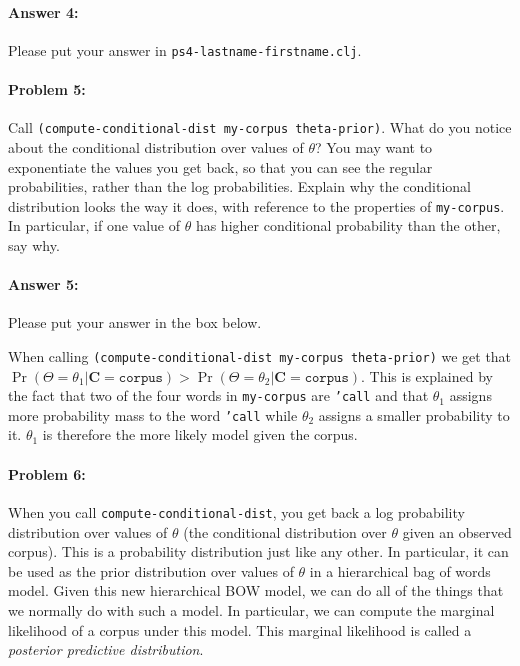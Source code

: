 \documentclass[10pt]{article}
\newcommand{\PSnum}{4}
\begin{document}
\paragraph{Answer 4:} Please put your answer in
\texttt{ps\PSnum-lastname-firstname.clj}.

\noindent\hrulefill %

\paragraph{Problem 5:}
Call \texttt{(compute-conditional-dist my-corpus theta-prior)}. What
do you notice about the conditional distribution over values of
$\theta$?  You may want to exponentiate the values you get back, so
that you can see the regular probabilities, rather than the log
probabilities. Explain why the conditional distribution looks the way
it does, with reference to the properties of \texttt{my-corpus}.  In
particular, if one value of $\theta$ has higher conditional probability
than the other, say why.

\paragraph{Answer 5:} Please put your answer in the box below.

\begin{mdframed}
When calling  \texttt{(compute-conditional-dist my-corpus theta-prior)} we get that $\Pr(\Theta=\theta_1|\mathbf{C}=\texttt{corpus}) >  \Pr(\Theta=\theta_2|\mathbf{C}=\texttt{corpus})$. This is explained by the fact that two of the four words in \texttt{my-corpus} are \texttt{'call} and that  $\theta_1$ assigns more probability mass to the word  \texttt{'call} while $\theta_2$ assigns a smaller probability to it. $\theta_1$ is therefore the more likely model given the corpus.
\end{mdframed}

\noindent\hrulefill %

\paragraph{Problem 6:}
When you call \texttt{compute-conditional-dist}, you get back a log
probability distribution over values of $\theta$ (the conditional
distribution over $\theta$ given an observed corpus). This is a
probability distribution just like any other. In particular, it can be
used as the prior distribution over values of $\theta$ in a
hierarchical bag of words model. Given this new hierarchical BOW
model, we can do all of the things that we normally do with such a
model. In particular, we can compute the marginal likelihood of a
corpus under this model. This marginal likelihood is called a
\emph{posterior predictive distribution}.\\
\end{document}
